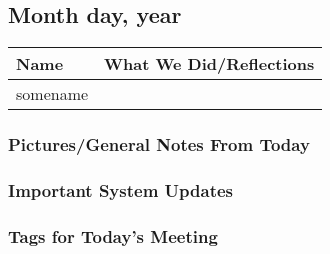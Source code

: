 \subsection*{Month day, year}

\begin{center}
\begin{tabular}{ |p{2cm}|p{10cm}| }
 \hline
 \textbf{Name} & \textbf{What We Did/Reflections} \\
 \hline
    somename & \textit{} \\ 
 \hline

\end{tabular}
\end{center}
\subsubsection*{Pictures/General Notes From Today}



\subsubsection*{Important System Updates}



\subsubsection*{Tags for Today's Meeting}


